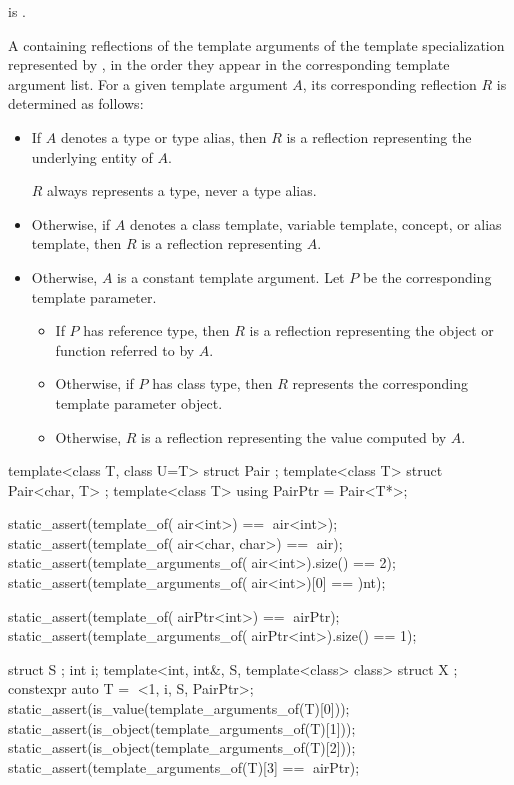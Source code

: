 \begin{itemdescr}
\pnum
\constantwhen
{} is .

\pnum
\returns
A  containing reflections
of the template arguments
of the template specialization represented by ,
in the order they appear in the corresponding template argument list.
For a given template argument $A$,
its corresponding reflection $R$ is determined as follows:
\begin{itemize}
\item
  If $A$ denotes a type or type alias,
  then $R$ is a reflection representing the underlying entity of $A$.
  \begin{note}
  $R$ always represents a type, never a type alias.
  \end{note}
\item
  Otherwise, if $A$ denotes a
  class template,
  variable template,
  concept, or
  alias template,
  then $R$ is a reflection representing $A$.
\item
  Otherwise, $A$ is a constant template argument.
  Let $P$ be the corresponding template parameter.
  \begin{itemize}
  \item
    If $P$ has reference type,
    then $R$ is a reflection
    representing the object or function referred to by $A$.
  \item
    Otherwise, if $P$ has class type,
    then $R$ represents the corresponding template parameter object.
  \item
    Otherwise, $R$ is a reflection representing the value computed by $A$.
  \end{itemize}
\end{itemize}
\begin{example}
\begin{codeblock}
template<class T, class U=T> struct Pair { };
template<class T> struct Pair<char, T> { };
template<class T> using PairPtr = Pair<T*>;

static_assert(template_of(^^Pair<int>) == ^^Pair<int>);
static_assert(template_of(^^Pair<char, char>) == ^^Pair);
static_assert(template_arguments_of(^^Pair<int>).size() == 2);
static_assert(template_arguments_of(^^Pair<int>)[0] == ^^int);

static_assert(template_of(^^PairPtr<int>) == ^^PairPtr);
static_assert(template_arguments_of(^^PairPtr<int>).size() == 1);

struct S { };
int i;
template<int, int&, S, template<class> class>
  struct X { };
constexpr auto T = ^^X<1, i, S{}, PairPtr>;
static_assert(is_value(template_arguments_of(T)[0]));
static_assert(is_object(template_arguments_of(T)[1]));
static_assert(is_object(template_arguments_of(T)[2]));
static_assert(template_arguments_of(T)[3] == ^^PairPtr);
\end{codeblock}
\end{example}
\end{itemdescr}

